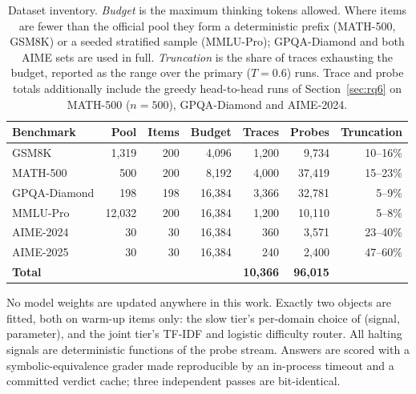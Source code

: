 \documentclass[acmsmall]{acmart}
\theoremstyle{acmdefinition}%
\theoremstyle{acmplain}}{}%
\begin{document}
\begin{table}[t]
\caption{Dataset inventory. \emph{Budget} is the maximum thinking tokens allowed. Where items are fewer than the official pool they form a deterministic prefix (MATH-500, GSM8K) or a seeded stratified sample (MMLU-Pro); GPQA-Diamond and both AIME sets are used in full. \emph{Truncation} is the share of traces exhausting the budget, reported as the range over the primary ($T{=}0.6$) runs. Trace and probe totals additionally include the greedy head-to-head runs of Section~\ref{sec:rq6} on MATH-500 ($n{=}500$), GPQA-Diamond and AIME-2024.}
\label{tab:data}
\small
\setlength{\tabcolsep}{4.5pt}
\begin{tabular}{@{}lrrrrrr@{}}
\toprule
\textbf{Benchmark} & \textbf{Pool} & \textbf{Items} & \textbf{Budget} & \textbf{Traces} & \textbf{Probes} & \textbf{Truncation} \\
\midrule
GSM8K            & 1{,}319 & 200 & 4{,}096  & 1{,}200 & 9{,}734  & 10--16\% \\
MATH-500         & 500     & 200 & 8{,}192  & 4{,}000 & 37{,}419 & 15--23\% \\
GPQA-Diamond     & 198     & 198 & 16{,}384 & 3{,}366 & 32{,}781 & 5--9\% \\
MMLU-Pro         & 12{,}032& 200 & 16{,}384 & 1{,}200 & 10{,}110 & 5--8\% \\
AIME-2024        & 30      & 30  & 16{,}384 & 360     & 3{,}571  & 23--40\% \\
AIME-2025        & 30      & 30  & 16{,}384 & 240     & 2{,}400  & 47--60\% \\
\midrule
\textbf{Total}   &         &     &          & \textbf{10{,}366} & \textbf{96{,}015} & \\
\bottomrule
\end{tabular}
\end{table}

No model weights are updated anywhere in this work. Exactly two objects are fitted, both on warm-up items only: the slow tier's per-domain choice of (signal, parameter), and the joint tier's TF-IDF and logistic difficulty router. All halting signals are deterministic functions of the probe stream. Answers are scored with a symbolic-equivalence grader made reproducible by an in-process timeout and a committed verdict cache; three independent passes are bit-identical.
\end{document}
